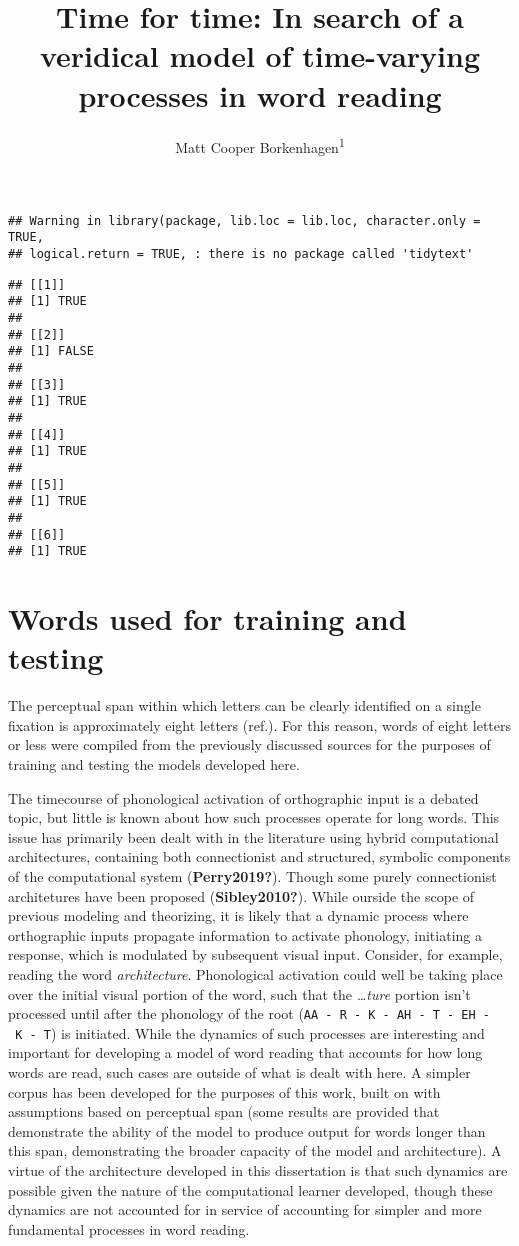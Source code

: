 \documentclass[
  american,
  ,man,floatsintext]{apa6}
\title{Time for time: In search of a veridical model of time-varying processes in word reading}
\author{Matt Cooper Borkenhagen\textsuperscript{1}}
\date{}
\affiliation{\vspace{0.5cm}\textsuperscript{1} Department of Psychology, University of Wisconsin, Madison}
\begin{document}
\maketitle

\begin{verbatim}
## Warning in library(package, lib.loc = lib.loc, character.only = TRUE,
## logical.return = TRUE, : there is no package called 'tidytext'
\end{verbatim}

\begin{verbatim}
## [[1]]
## [1] TRUE
## 
## [[2]]
## [1] FALSE
## 
## [[3]]
## [1] TRUE
## 
## [[4]]
## [1] TRUE
## 
## [[5]]
## [1] TRUE
## 
## [[6]]
## [1] TRUE
\end{verbatim}

\hypertarget{words-used-for-training-and-testing}{%
\section{Words used for training and testing}\label{words-used-for-training-and-testing}}

The perceptual span within which letters can be clearly identified on a single fixation is approximately eight letters (ref.). For this reason, words of eight letters or less were compiled from the previously discussed sources for the purposes of training and testing the models developed here.

The timecourse of phonological activation of orthographic input is a debated topic, but little is known about how such processes operate for long words. This issue has primarily been dealt with in the literature using hybrid computational architectures, containing both connectionist and structured, symbolic components of the computational system (\textbf{Perry2019?}). Though some purely connectionist architetures have been proposed (\textbf{Sibley2010?}). While ourside the scope of previous modeling and theorizing, it is likely that a dynamic process where orthographic inputs propagate information to activate phonology, initiating a response, which is modulated by subsequent visual input. Consider, for example, reading the word \emph{architecture}. Phonological activation could well be taking place over the initial visual portion of the word, such that the \emph{\ldots ture} portion isn't processed until after the phonology of the root (\texttt{AA\ -\ R\ -\ K\ -\ AH\ -\ T\ -\ EH\ -\ K\ -\ T}) is initiated. While the dynamics of such processes are interesting and important for developing a model of word reading that accounts for how long words are read, such cases are outside of what is dealt with here. A simpler corpus has been developed for the purposes of this work, built on with assumptions based on perceptual span (some results are provided that demonstrate the ability of the model to produce output for words longer than this span, demonstrating the broader capacity of the model and architecture). A virtue of the architecture developed in this dissertation is that such dynamics are possible given the nature of the computational learner developed, though these dynamics are not accounted for in service of accounting for simpler and more fundamental processes in word reading.
\end{document}
